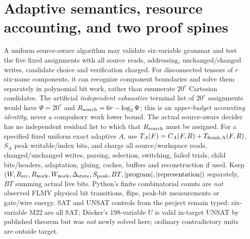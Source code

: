 \documentclass[11pt]{article}
\begin{document}
\section{Adaptive semantics, resource accounting, and two proof spines}
A uniform source-aware algorithm may validate six-variable grammar and test the five fixed assignments with all source reads, addressing, unchanged/changed writes, candidate choice and verification charged. For disconnected tensors of \(r\) six-name components, it can recognize component boundaries and solve them separately in polynomial bit work, rather than enumerate \(20^r\) Cartesian candidates. The artificial \emph{independent exhaustive} terminal list of \(20^r\) assignments would have \(\Psi=20^r\) and \(R_{\rm search}=6r-\log_2\Psi\); this is an \emph{upper-budget accounting identity}, never a compulsory work lower bound. The actual source-aware decider has no independent residual list to which that \(R_{\rm search}\) must be assigned.
For a specified fixed uniform exact adaptive \(A\), use \(T_A(F)=C_A(F,R)+T_{\rm finish,A}(F,R)\), \(S_A\) peak writable/index bits, and charge all source/workspace reads, changed/unchanged writes, parsing, selection, switching, failed trials, child bits/headers, adaptation, gluing, caches, buffers and reconstruction if used. Keep \((W,R_{\rm src},R_{\rm work},W_{\rm work},\Delta_{\rm state},S_{\rm peak},BT,|\mathrm{program}|,|\mathrm{representation}|)\) separately, \(BT\) summing actual live bits. Python's finite combinatorial counts are \emph{not} observed FLMV physical bit transitions, flips, peak-bit measurements or gate/wire energy. SAT and UNSAT controls from the project remain typed: six-variable M22 are all SAT; D\"ocker's 198-variable \(U\) is valid in-target UNSAT by published theorem but was \emph{not} newly solved here; ordinary contradictory units are outside target.
\end{document}
